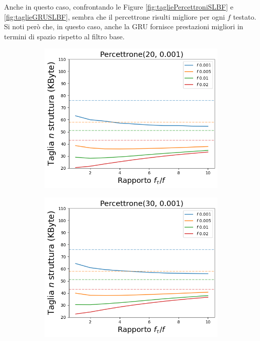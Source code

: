 \documentclass[../../main.tex]{subfiles}
\begin{document}
    Anche in questo caso, confrontando le Figure \ref{fig:tagliePercettroniSLBF} e \ref{fig:taglieGRUSLBF}, sembra che il percettrone risulti migliore per ogni $f$ testato. Si noti però che, in questo caso, anche la GRU fornisce prestazioni migliori in termini di spazio rispetto al filtro base.

    \begin{figure}[H]
        \centering
        \begin{subfigure}[b]{0.49\textwidth}
            \centering
            \includegraphics[width = \textwidth]{immagini/7/SLBF/Percettrone(20, 0.001)_Taglia.png}
            \caption{}
            \label{fig:SLBFTagliaPercettrone20}
        \end{subfigure}
        \begin{subfigure}[b]{0.49\textwidth}
            \centering
            \includegraphics[width = \textwidth]{immagini/7/SLBF/Percettrone(30, 0.001)_Taglia.png}

\end{subfigure}
\end{figure}
\end{document}
